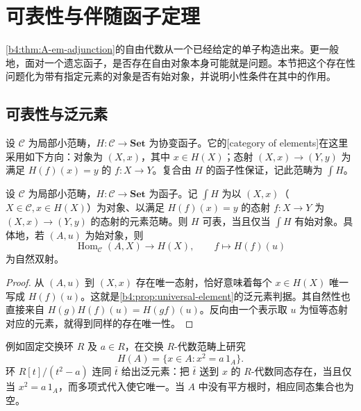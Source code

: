 

\section{可表性与伴随函子定理}
\label{b4:sec:A04}

\cref{b4:thm:A-em-adjunction}的自由代数从一个已经给定的单子构造出来。更一般地，面对一个遗忘函子，是否存在自由对象本身可能就是问题。本节把这个存在性问题化为带有指定元素的对象是否有始对象，并说明小性条件在其中的作用。

\subsection{可表性与泛元素}
\label{b4:subsec:A04:01}

设 \(\mathcal C\) 为局部小范畴，\(H:\mathcal C\to\mathbf{Set}\) 为协变函子。它的[category of elements]在这里采用如下方向：对象为 \((X,x)\)，其中 \(x\in H(X)\)；态射 \((X,x)\to(Y,y)\) 为满足 \(H(f)(x)=y\) 的 \(f:X\to Y\)。复合由 \(H\) 的函子性保证，记此范畴为 \(\int H\)。

\begin{proposition}\label{b4:prop:A-representability-initial}
	设 \(\mathcal C\) 为局部小范畴，\(H:\mathcal C\to\mathbf{Set}\) 为函子。记 \(\int H\) 为以 \((X,x)\)（\(X\in\mathcal C,x\in H(X)\)）为对象、以满足 \(H(f)(x)=y\) 的态射 \(f:X\to Y\) 为 \((X,x)\to(Y,y)\) 的态射的元素范畴。则 \(H\) 可表，当且仅当 \(\int H\) 有始对象。具体地，若 \((A,u)\) 为始对象，则
	\[
		\operatorname{Hom}_{\mathcal C}(A,X)\longrightarrow H(X), \qquad f\longmapsto H(f)(u)
	\]
	为自然双射。
\end{proposition}
\begin{proof}
	从 \((A,u)\) 到 \((X,x)\) 存在唯一态射，恰好意味着每个 \(x\in H(X)\) 唯一写成 \(H(f)(u)\)。这就是\cref{b4:prop:universal-element}的泛元素判据。其自然性也直接来自 \(H(g)H(f)(u)=H(gf)(u)\)。反向由一个表示取 \(u\) 为恒等态射对应的元素，就得到同样的存在唯一性。
\end{proof}

例如固定交换环 \(R\) 及 \(a\in R\)，在交换 \(R\)-代数范畴上研究
\[
	H(A)=\{x\in A:x^2=a\,1_A\}.
\]
环 \(R[t]/(t^2-a)\) 连同 \(\bar t\) 给出泛元素：把 \(\bar t\) 送到 \(x\) 的 \(R\)-代数同态存在，当且仅当 \(x^2=a\,1_A\)，而多项式代入使它唯一。当 \(A\) 中没有平方根时，相应同态集合也为空。

